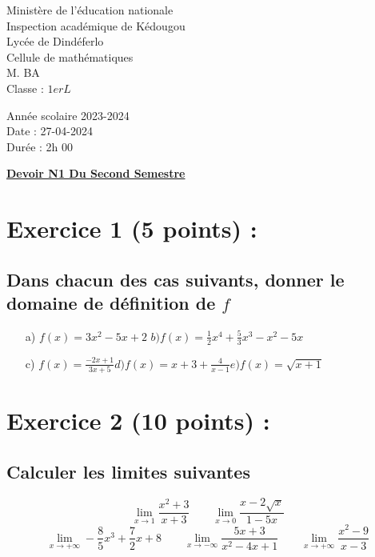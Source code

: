 \documentclass{article}
\begin{document}
\begin{minipage}{0.5\textwidth}
	Ministère de l'éducation nationale  \\
	Inspection académique de Kédougou   \\
	Lycée de Dindéferlo            \\
	Cellule de mathématiques            \\
	M. BA                          \\
	Classe : $1erL$  \\
\end{minipage}
\begin{minipage}{0.5\textwidth}
	Année scolaire 2023-2024 \\
	Date : 27-04-2024 \\
	Durée : 2h 00 \\
\end{minipage}

\begin{center}
	\textbf{{\underline{Devoir N1 Du Second Semestre}}}
\end{center}
\section*{Exercice 1 (5 points) :}
\subsection*{ Dans chacun des cas suivants, donner le domaine de définition de $f$}
\begin{itemize}
\item[a)]$f(x)=3x^{2}-5x+2$\quad\quad 
$b)f(x)=\frac{1}{2}x^{4}+\frac{5}{3}x^{3}-x^{2}-5x$
\item[c)]$f(x)=\frac{-2x+1}{3x+5}$\quad\quad $d)f(x)=x+3+\frac{4}{x-1}$\quad\quad $e)f(x)=\sqrt{x+1}$
\end{itemize}
\section*{Exercice 2 (10 points) :}
\subsection*{Calculer les limites suivantes}
\[\lim_{x \to 1}\frac{x^{2}+3}{x+3}\quad\quad\lim_{x \to 0}\frac{x-2\sqrt{x}}{1-5x}\]
\[\lim_{x \to +\infty}-\frac{8}{5}x^{3}+\frac{7}{2}x+8\quad\quad \lim_{x \to -\infty}\frac{5x+3}{x^{2}-4x+1}\quad\quad \lim_{x \to +\infty}\frac{x^{2}-9}{x-3}\]
\end{document}
